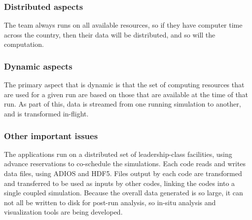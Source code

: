  \subsubsection*{Distributed aspects}



The team always runs on all available resources, so if they have computer time
across the country, then their data will be distributed, and so will the
computation.

 \subsubsection*{Dynamic aspects}



The primary aspect that is dynamic is that the set of computing resources that are used
for a given run are based on those that are available at the time of that run.  As part of this,
data is streamed from one running simulation to another, and is transformed in-flight.

 \subsubsection*{Other important issues}



The applications run on a distributed set of leadership-class
facilities, using advance reservations to co-schedule the simulations.
Each code reads and writes data files, using ADIOS and HDF5.  Files
output by each code are transformed and transferred to be used as
inputs by other codes, linking the codes into a single coupled
simulation.  Because the overall data generated is so large, it can
not all be written to disk for post-run analysis, so in-situ analysis
and visualization tools are being developed.


